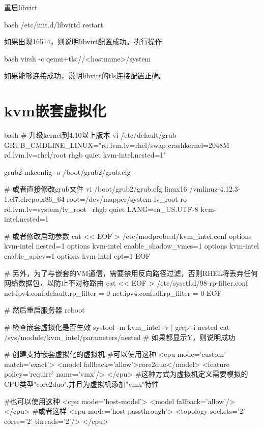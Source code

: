重启libvirt
\begin{code-block}{bash}
/etc/init.d/libvirtd restart
\end{code-block}

如果出现16514，则说明libvirt配置成功。执行操作
\begin{code-block}{bash}
virsh -c qemu+tls://<hostname>/system
\end{code-block}

如果能够连接成功，说明libvirt的tls连接配置正确。

\section{kvm嵌套虚拟化}
\begin{code-block}{bash}
# 升级kernel到4.10以上版本
vi /etc/default/grub
GRUB_CMDLINE_LINUX="rd.lvm.lv=rhel/swap crashkernel=2048M rd.lvm.lv=rhel/root rhgb quiet kvm-intel.nested=1"

grub2-mkconfig -o /boot/grub2/grub.cfg

# 或者直接修改grub文件
vi /boot/grub2/grub.cfg
linux16 /vmlinuz-4.12.3-1.el7.elrepo.x86_64 root=/dev/mapper/system-lv_root ro rd.lvm.lv=system/lv_root \
    rhgb quiet LANG=en_US.UTF-8 kvm-intel.nested=1

# 或者修改启动参数
cat << EOF > /etc/modprobe.d/kvm_intel.conf
options kvm-intel nested=1
options kvm-intel enable_shadow_vmcs=1
options kvm-intel enable_apicv=1
options kvm-intel ept=1
EOF

# 另外，为了与嵌套的VM通信，需要禁用反向路径过滤，否则RHEL将丢弃任何网络数据包，以防止不对称路由
cat << EOF > /etc/sysctl.d/98-rp-filter.conf
net.ipv4.conf.default.rp_filter = 0
net.ipv4.conf.all.rp_filter = 0
EOF

# 然后重启服务器
reboot

# 检查嵌套虚拟化是否生效
systool -m kvm_intel -v   | grep -i nested
cat /sys/module/kvm_intel/parameters/nested
# 如果都显示Y，则说明成功

# 创建支持嵌套虚拟化的虚拟机
#可以使用这种
  <cpu mode='custom' match='exact'>
    <model fallback='allow'>core2duo</model>
    <feature policy='require' name='vmx'/>
  </cpu>
#这种方式为虚拟机定义需要模拟的CPU类型"core2duo",并且为虚拟机添加"vmx"特性

#也可以使用这种
  <cpu mode='host-model'>
    <model fallback='allow'/>
  </cpu>
#或者这样
 <cpu mode='host-passthrough'>
    <topology sockets='2' cores='2' threads='2'/>
 </cpu>
\end{code-block}

